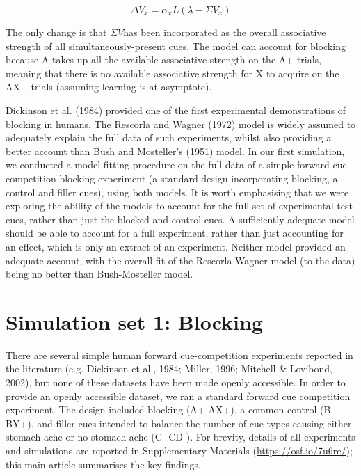 \documentclass[twocolumn]{article}
\begin{document}
\begin{equation}
 \Delta V_{x} = \alpha_{x}L(\lambda - \Sigma V_{x})
\end{equation}

The only change is that $\Sigma V$has been incorporated as the overall
associative strength of all simultaneously-present cues. The model can
account for blocking because A takes up all the available associative
strength on the A+ trials, meaning that there is no available
associative strength for X to acquire on the AX+ trials (assuming
learning is at asymptote).

Dickinson et al. (1984) provided one of the first experimental
demonstrations of blocking in humans. The Rescorla and Wagner (1972)
model is widely assumed to adequately explain the full data of such
experiments, whilst also providing a better account than Bush and
Mosteller's (1951) model. In our first simulation, we conducted a
model-fitting procedure on the full data of a simple forward cue
competition blocking experiment (a standard design incorporating
blocking, a control and filler cues), using both models. It is worth
emphasising that we were exploring the ability of the models to account
for the full set of experimental test cues, rather than just the blocked
and control cues. A sufficiently adequate model should be able to
account for a full experiment, rather than just accounting for an
effect, which is only an extract of an experiment. Neither model
provided an adequate account, with the overall fit of the
Rescorla-Wagner model (to the data) being no better than Bush-Mosteller
model.


\section{Simulation set 1: Blocking} 

There are several simple human forward cue-competition experiments
reported in the literature (e.g. Dickinson et al., 1984; Miller, 1996;
Mitchell \& Lovibond, 2002), but none of these datasets have been made
openly accessible. In order to provide an openly accessible dataset, we
ran a standard forward cue competition experiment. The design included
blocking (A+ AX+), a common control (B- BY+), and filler cues intended
to balance the number of cue types causing either stomach ache or no
stomach ache (C- CD-). For brevity, details of all experiments and
simulations are reported in Supplementary Materials
(\url{https://osf.io/7u6re/}); this main article summarises the key
findings.
\end{document}

